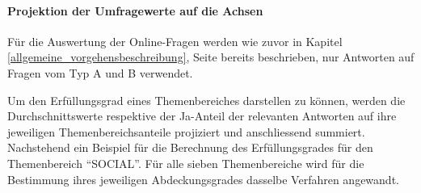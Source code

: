 \documentclass[../../main.tex]{subfiles}
\begin{document}
\paragraph*{Projektion der Umfragewerte auf die Achsen}\mbox{}

\begin{sloppypar}
Für die Auswertung der Online-Fragen werden wie zuvor in Kapitel \ref{allgemeine_vorgehensbeschreibung},  Seite \pageref{allgemeine_vorgehensbeschreibung} bereits beschrieben, nur Antworten auf Fragen vom Typ A und B verwendet.

Um den Erfüllungsgrad eines Themenbereiches darstellen zu können, werden die Durchschnittswerte respektive der Ja-Anteil der relevanten Antworten auf ihre jeweiligen Themenbereichsanteile projiziert und anschliessend summiert.
\newpage
Nachstehend ein Beispiel für die Berechnung des Erfüllungsgrades für den Themenbereich "`SOCIAL"'. Für alle sieben Themenbereiche wird für die Bestimmung ihres jeweiligen Abdeckungsgrades dasselbe Verfahren angewandt.\footnotemark
\end{sloppypar}


\sloppy 
\end{document}
